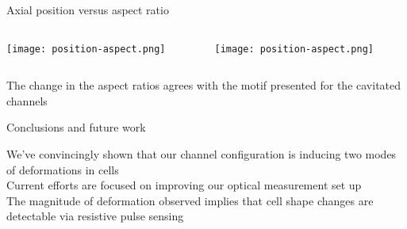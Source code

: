 \begin{frame}[c]{Axial position versus aspect ratio}
	
	\begin{columns}[t]
	 
	\begin{column}[T]{2.25in}
		{\centering
			\texttt{[image: position-aspect.png]} \\
			\par
		}
	\end{column}
	
	
	\begin{column}[T]{2.25in}
		{\centering
			\texttt{[image: position-aspect.png]} \\
			\par
		}
	\end{column}
	
	
	
	\end{columns}
	
	
	The change in the aspect ratios agrees with the motif presented for the cavitated channels
	
	

	
\end{frame}



\begin{frame}[c]{Conclusions and future work}
	
	We've convincingly shown that our channel configuration is inducing two modes of deformations in cells \\
	
	Current efforts are focused on improving our optical measurement set up \\
	
	The magnitude of deformation observed implies that cell shape changes are detectable via resistive pulse sensing \\
	

	
\end{frame}





